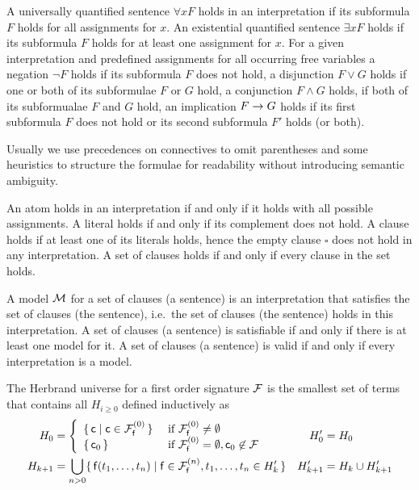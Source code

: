 \begin{definition}\label{def:semantics:FOF}
	A universally quantified sentence $\forall x F$  
	holds in an interpretation if its subformula $F$ holds for all assignments for $x$.
	An existential quantified sentence $\exists xF$ holds if its subformula $F$ holds for at least one assignment for $x$.
	For a given interpretation and predefined assignments for all occurring free variables
	a negation $\lnot F$ holds if its subformula $F$ does not hold, 
	a disjunction $F\lor G$ holds if one or both of its subformulae $F$ or $G$ hold,
	a conjunction $F\land G$ holds, if both of its subformualae $F$ and $G$ hold, 
	an implication $F\rightarrow G$ holds if its first subformula $F$ does not hold or its second subformula $F'$ holds (or both).
	\begin{remark}Usually we use precedences on connectives to omit parentheses 
		and some heuristics to structure the formulae for readability 
		without introducing semantic ambiguity.
	\end{remark}
\end{definition}

\begin{definition}\label{def:semantics:CNF}
	An atom holds in an interpretation if and only if it 
	holds with all possible assignments. 
	A literal holds if and only if its complement does not hold.
	A clause holds if at least one of its literals holds,
	hence the empty clause $\square$ does not hold in any interpretation.
	A set of clauses holds if and only if every clause in the set holds.
\end{definition}

\begin{definition}
	A {\myem model} ${\mathcal M}$ for a set of clauses (a sentence) is an interpretation that 
	{\myem satisfies} the set of clauses (the sentence),
	i.e.~the set of clauses (the sentence) holds in this interpretation.
	A set of clauses (a sentence) is {\myem satisfiable} if and only if there is at least one model for it. 
	A set of clauses (a sentence) is {\myem valid} if and only if every interpretation is a model.
\end{definition}

\begin{definition}\label{def:hk}
	The {\myem Herbrand universe} for a first order signature ${\mathcal F}$ 
	is the smallest set of terms that contains all $H_{i\geq 0}$ defined inductively as
	\begin{align*}
	H_0 &= \left\{ 
	\begin{array}{ll}
	\{\,\mc \mid \mc\in\mcFfn[0]\,\} 
	&\text{if } \mcFfn[0]\not=\emptyset\\
	\{\,\mc_0\,\}
	&\text{if } \mcFfn[0]=\emptyset, \mc_0\not\in\mcF
	\end{array}
	\right. 
	&
	H'_0 &= H_0
	\\
	H_{k+1} &= \bigcup_{n> 0} 
	\{\,  
	\mf(t_1,\ldots,t_n) \mid
	\mf\in\mcFfn[n],
	t_1,\ldots,t_n \in H_k'
	\,\}
	&
	H'_{k+1} &= H_k \cup H'_{k+1}
	\end{align*}
	
\end{definition}

